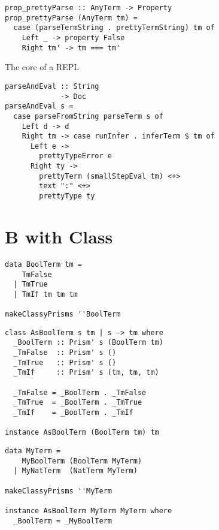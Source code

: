 \documentclass{beamer}
\begin{document}
\begin{frame}[fragile]
  \begin{verbatim}
prop_prettyParse :: AnyTerm -> Property
prop_prettyParse (AnyTerm tm) =
  case (parseTermString . prettyTermString) tm of
    Left _ -> property False
    Right tm' -> tm === tm'
  \end{verbatim}
\end{frame} 

\begin{frame}[fragile]
  \begin{center}
   The core of a REPL 
  \end{center}
  \begin{verbatim}
parseAndEval :: String
             -> Doc
parseAndEval s =
  case parseFromString parseTerm s of
    Left d -> d
    Right tm -> case runInfer . inferTerm $ tm of
      Left e -> 
        prettyTypeError e
      Right ty ->
        prettyTerm (smallStepEval tm) <+> 
        text ":" <+> 
        prettyType ty
  \end{verbatim}
\end{frame} 

\section{B with Class}

\begin{frame}[fragile]
  \begin{verbatim}
data BoolTerm tm =
    TmFalse
  | TmTrue
  | TmIf tm tm tm

makeClassyPrisms ''BoolTerm
  \end{verbatim}
\end{frame} 

\begin{frame}[fragile]
  \begin{verbatim}
class AsBoolTerm s tm | s -> tm where
  _BoolTerm :: Prism' s (BoolTerm tm)
  _TmFalse  :: Prism' s ()
  _TmTrue   :: Prism' s ()
  _TmIf     :: Prism' s (tm, tm, tm)

  _TmFalse = _BoolTerm . _TmFalse
  _TmTrue  = _BoolTerm . _TmTrue
  _TmIf    = _BoolTerm . _TmIf

instance AsBoolTerm (BoolTerm tm) tm
  \end{verbatim}
\end{frame} 

\begin{frame}[fragile]
  \begin{verbatim}
data MyTerm =
    MyBoolTerm (BoolTerm MyTerm)
  | MyNatTerm  (NatTerm MyTerm)

makeClassyPrisms ''MyTerm

instance AsBoolTerm MyTerm MyTerm where
  _BoolTerm = _MyBoolTerm
  \end{verbatim}
\end{frame} 
\end{document}
